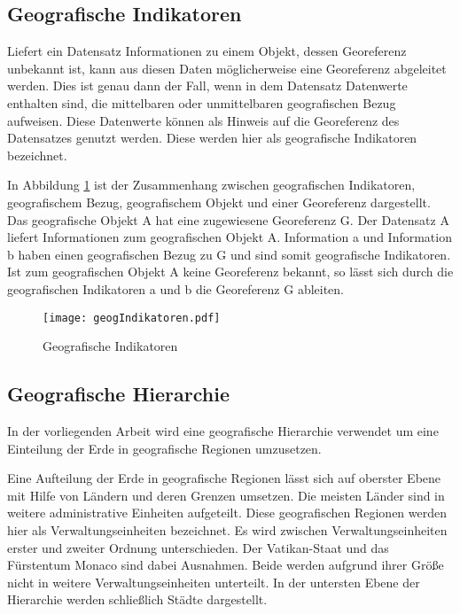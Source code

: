 		\subsection{Geografische Indikatoren}

			Liefert ein Datensatz Informationen zu einem Objekt, dessen Georeferenz unbekannt ist, kann aus diesen Daten möglicherweise eine Georeferenz abgeleitet werden. 
			Dies ist genau dann der Fall, wenn in dem Datensatz Datenwerte enthalten sind, die mittelbaren oder unmittelbaren geografischen Bezug aufweisen.
			Diese Datenwerte können als Hinweis auf die Georeferenz des Datensatzes genutzt werden.
			Diese werden hier als geografische Indikatoren bezeichnet.

			In Abbildung \ref{img:geogIndi} ist der Zusammenhang zwischen geografischen Indikatoren, geografischem Bezug, geografischem Objekt und einer Georeferenz dargestellt. 
			Das geografische Objekt A hat eine zugewiesene Georeferenz G.
			Der Datensatz A liefert Informationen zum geografischen Objekt A.
			Information a und Information b haben einen geografischen Bezug zu G und sind somit geografische Indikatoren.
			Ist zum geografischen Objekt A keine Georeferenz bekannt, so lässt sich durch die geografischen Indikatoren a und b die Georeferenz G ableiten. 

			\begin{figure}[h!]
			\begin{center}
				\texttt{[image: geogIndikatoren.pdf]}
				\caption{Geografische Indikatoren}
				\label{img:geogIndi}
			\end{center}
			\end{figure}	

		\subsection{Geografische Hierarchie} \label{sub:geografischeHierarchie} 
			
			In der vorliegenden Arbeit wird eine geografische Hierarchie verwendet um eine Einteilung der Erde in geografische Regionen umzusetzen.

			Eine Aufteilung der Erde in geografische Regionen lässt sich auf oberster Ebene mit Hilfe von Ländern und deren Grenzen umsetzen. 
			Die meisten Länder sind in weitere administrative Einheiten aufgeteilt.
			Diese geografischen Regionen werden hier als Verwaltungseinheiten bezeichnet.
			Es wird zwischen Verwaltungseinheiten erster und zweiter Ordnung unterschieden. 
			Der Vatikan-Staat und das Fürstentum Monaco sind dabei Ausnahmen.
			Beide werden aufgrund ihrer Größe nicht in weitere Verwaltungseinheiten unterteilt.
			In der untersten Ebene der Hierarchie werden schließlich Städte dargestellt.


